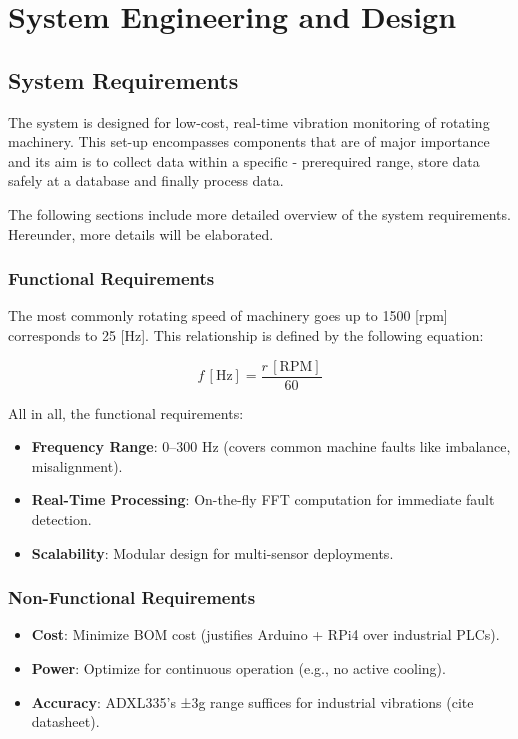 \chapter{System Engineering and Design}  
\label{chap3}  

\section{System Requirements} 
{ 
The system is designed for low-cost, real-time vibration monitoring of rotating machinery. This set-up encompasses components that are of major importance and its aim is to collect data within a specific - prerequired range, store data safely at a database and finally process data.

The following sections include more detailed overview of the system requirements. Hereunder, more details will be elaborated.
}

\subsection{Functional Requirements} 
{ 
The most commonly rotating speed of machinery goes up to 1500 [rpm] corresponds to 25 [Hz]. This relationship is defined by the following equation: 

\begin{equation}
	f \, [\mathrm{Hz}] = \frac{r \, [\mathrm{RPM}]}{60}
\end{equation}

All in all, the functional requirements:

\begin{itemize}  
	\item \textbf{Frequency Range}: 0–300 Hz (covers common machine faults like imbalance, misalignment).  
	\item \textbf{Real-Time Processing}: On-the-fly FFT computation for immediate fault detection.  
	\item \textbf{Scalability}: Modular design for multi-sensor deployments.  
\end{itemize}  
}

\subsection{Non-Functional Requirements} 
{ 
\begin{itemize}  
	\item \textbf{Cost}: Minimize BOM cost (justifies Arduino + RPi4 over industrial PLCs).  
	\item \textbf{Power}: Optimize for continuous operation (e.g., no active cooling).  
	\item \textbf{Accuracy}: ADXL335’s ±3g range suffices for industrial vibrations (cite datasheet).  
\end{itemize}  
}

